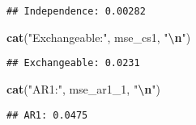 \documentclass[
]{article}
\newenvironment{Shaded}{\begin{snugshade}}{\end{snugshade}}
\newcommand{\FunctionTok}[1]{\textcolor[rgb]{0.13,0.29,0.53}{\textbf{#1}}}
\newcommand{\NormalTok}[1]{#1}
\newcommand{\SpecialCharTok}[1]{\textcolor[rgb]{0.81,0.36,0.00}{\textbf{#1}}}
\newcommand{\StringTok}[1]{\textcolor[rgb]{0.31,0.60,0.02}{#1}}
\begin{document}
\begin{verbatim}
## Independence: 0.00282
\end{verbatim}

\begin{Shaded}
\begin{Highlighting}[]
\FunctionTok{cat}\NormalTok{(}\StringTok{"Exchangeable:"}\NormalTok{, mse\_cs1, }\StringTok{"}\SpecialCharTok{\textbackslash{}n}\StringTok{"}\NormalTok{)}
\end{Highlighting}
\end{Shaded}

\begin{verbatim}
## Exchangeable: 0.0231
\end{verbatim}

\begin{Shaded}
\begin{Highlighting}[]
\FunctionTok{cat}\NormalTok{(}\StringTok{"AR1:"}\NormalTok{, mse\_ar1\_1, }\StringTok{"}\SpecialCharTok{\textbackslash{}n}\StringTok{"}\NormalTok{)}
\end{Highlighting}
\end{Shaded}

\begin{verbatim}
## AR1: 0.0475
\end{verbatim}
\end{document}
